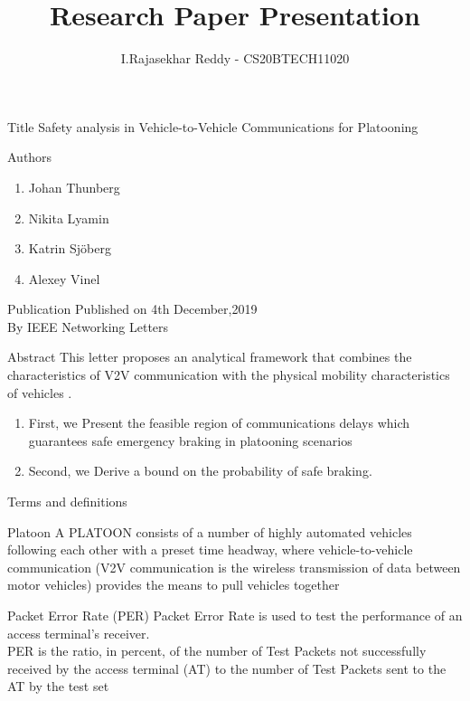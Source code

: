 \documentclass{beamer}
\title{Research Paper Presentation}
\author{I.Rajasekhar Reddy - CS20BTECH11020}
\begin{document}
\begin{frame}
\titlepage
\end{frame}
\begin{frame}
    \begin{block}{Title}
    Safety analysis in Vehicle-to-Vehicle Communications for Platooning 
    \end{block}
    \begin{block}{Authors}
    \begin{enumerate}
        \item Johan Thunberg
        \item Nikita Lyamin
        \item Katrin Sjöberg
        \item Alexey Vinel
    \end{enumerate}
    \end{block}
    \begin{block}{Publication}
    Published on 4th December,2019 \\
    By  IEEE Networking Letters
    \end{block}
\end{frame}
\begin{frame}
\begin{block}{Abstract}
This letter proposes an analytical framework that combines the characteristics of V2V communication with the physical mobility characteristics of vehicles .
\begin{enumerate}
    \item First, we Present the feasible region of communications delays which guarantees safe emergency braking in platooning scenarios
    \item Second, we Derive a bound on the probability of safe braking.
\end{enumerate} 
\end{block}
\end{frame}
\begin{frame}{Terms and definitions}
\begin{block}{Platoon}
A PLATOON consists of a number of highly automated
vehicles following each other with a preset time headway, where vehicle-to-vehicle communication  (V2V communication is the wireless transmission of data between motor vehicles) provides the means to pull vehicles together
\end{block}
\begin{block}{Packet Error Rate (PER)}
Packet Error Rate is used to test the performance of an access terminal's receiver.\\ PER is the ratio, in percent, of the number of Test Packets not successfully received by the access terminal (AT) to the number of Test Packets sent to the AT by the test set
\end{block}
\end{frame}
\end{document}
